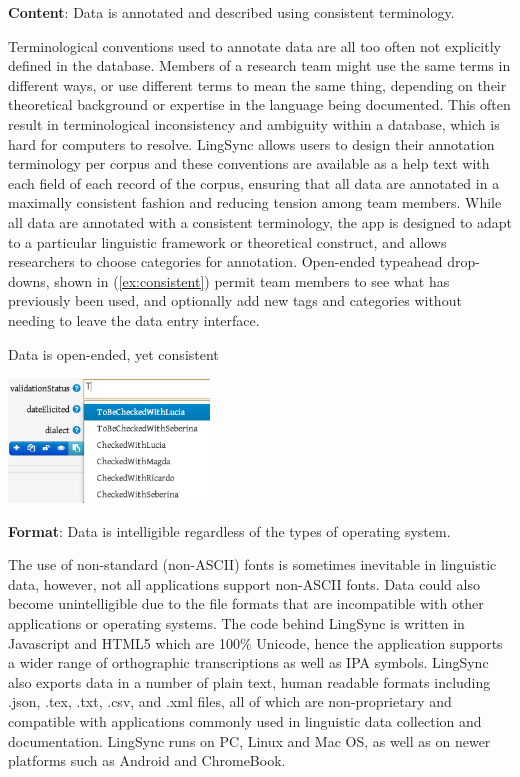 \documentclass[letterpaper, 12pt, dvips]{mitwpl}
\begin{document}
\begin{description} 

\item {\bf Content}: Data is annotated and described using consistent terminology.  

Terminological conventions used to annotate data are all too often not explicitly defined in the database. Members of a research team might use the same terms in different ways, or use different terms to mean the same thing, depending on their theoretical background or expertise in the language being documented. This often result in terminological inconsistency and ambiguity within a database, which is hard for computers to resolve.
LingSync allows users to design their annotation terminology per corpus and these conventions are available as a help text with each field of each record of the corpus, ensuring that all data are annotated in a maximally consistent fashion and reducing tension among team members.
While all data are annotated with a consistent  terminology, the app is designed to adapt to a particular linguistic framework or theoretical construct, and allows researchers to choose categories for annotation. Open-ended typeahead drop-downs, shown in (\ref{ex:consistent}) permit team members to see what has previously been used, and optionally add new tags and categories without needing to leave the data entry interface.


\begin{exe} 
\ex Data is open-ended, yet consistent

 \centering
    \includegraphics[width=0.4\textwidth]{typeaheadForPreviousCategories}

\label{ex:consistent}
\end{exe}

\item {\bf Format}: Data is intelligible regardless of the types of operating system. 
 
The use of non-standard (non-ASCII) fonts is sometimes inevitable in linguistic data, however, not all applications support non-ASCII fonts. Data could also become unintelligible due to the file formats that are incompatible with other applications or operating systems. 
The code behind LingSync is written in Javascript and HTML5 which are 100\% Unicode, hence the application supports a wider range of orthographic transcriptions as well as IPA symbols. LingSync also  exports data in a number of plain text, human readable formats including .json, .tex, .txt, .csv, and .xml files, all of which are non-proprietary and compatible with applications commonly used in linguistic data collection and documentation. LingSync runs on PC, Linux and Mac OS, as well as on newer platforms such as Android and ChromeBook. 


\end{description}
\end{document}
